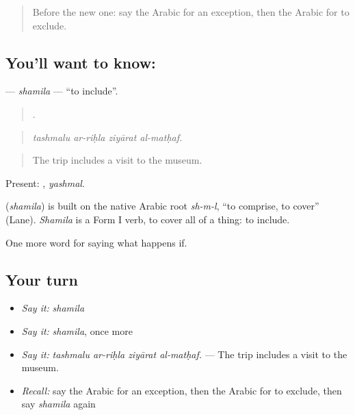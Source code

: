 \label{lesson:AR-C405-shamila}



\begin{quote}
Before the new one: say the Arabic for an exception, then the Arabic for to exclude.
\end{quote}

\subsection*{You'll want to know: }
\textbf{} — \emph{shamila} — \textquotedblleft{}to include\textquotedblright{}.

\begin{quote}
   .
\end{quote}

\begin{quote}
\emph{tashmalu ar-riḥla ziyārat al-matḥaf.}
\end{quote}

\begin{quote}
The trip includes a visit to the museum.
\end{quote}

Present: , \emph{yashmal}.

\begin{cousinweb}
\textbf{} (\emph{shamila}) is built on the native Arabic root \emph{sh-m-l}, \textquotedblleft{}to comprise, to cover\textquotedblright{} (Lane). \emph{Shamila} is a Form I verb, to cover all of a thing: to include.
\end{cousinweb}

\begin{grammarlens}[title={What you've built}]
One more word for saying what happens if.
\end{grammarlens}

\subsection*{Your turn}
\begin{itemize}
\raggedright
  \item \emph{Say it:} \emph{shamila}
  \item \emph{Say it:} \emph{shamila}, once more
  \item \emph{Say it:} \emph{tashmalu ar-riḥla ziyārat al-matḥaf.} — The trip includes a visit to the museum.
  \item \emph{Recall:} say the Arabic for an exception, then the Arabic for to exclude, then say \emph{shamila} again
\end{itemize}

